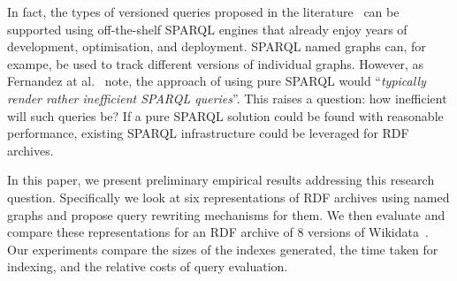 \documentclass{llncs}
\begin{document}


In fact, the types of versioned queries proposed in the literature~\cite{FernandezPU15} can be supported using off-the-shelf SPARQL engines that already enjoy years of development, optimisation, and deployment. SPARQL named graphs can, for exampe, be used to track different versions of individual graphs. However, as Fernandez at al.~\cite{FernandezUPK19} note, the approach of using pure SPARQL would ``\textit{typically render rather inefficient SPARQL queries}''. This raises a question: how inefficient will such queries be? If a pure SPARQL solution could be found with reasonable performance, existing SPARQL infrastructure could be leveraged for RDF archives.

In this paper, we present preliminary empirical results addressing this research question. Specifically we look at six representations of RDF archives using named graphs and propose query rewriting mechanisms for them. We then evaluate and compare these representations for an RDF archive of 8 versions of Wikidata~\cite{VrandecicK14}. Our experiments compare the sizes of the indexes generated, the time taken for indexing, and the relative costs of query evaluation.

\end{document}
